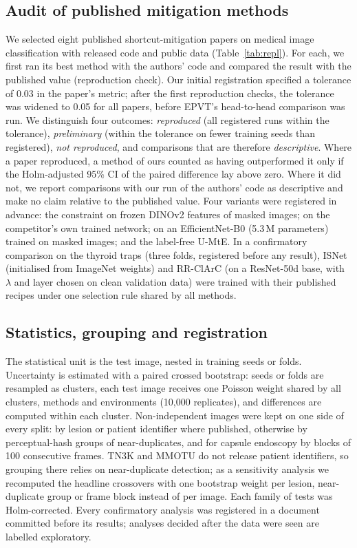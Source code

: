 \documentclass[12pt]{article}
\begin{document}
\subsection*{Audit of published mitigation methods}
We selected eight published shortcut-mitigation papers on medical image classification with released code and public data
(Table~\ref{tab:repl}). For each, we first ran its best method with the authors' code and compared the result with the
published value (reproduction check). Our initial registration specified a tolerance of 0.03 in the paper's metric; after
the first reproduction checks, the tolerance was widened to 0.05 for all papers, before EPVT's head-to-head comparison was
run. We distinguish four outcomes: \emph{reproduced} (all registered runs within the tolerance), \emph{preliminary}
(within the tolerance on fewer training seeds than registered), \emph{not reproduced}, and comparisons that are
therefore \emph{descriptive}. Where a paper reproduced, a method of ours counted as having outperformed it only if the
Holm-adjusted 95\% CI of the paired difference lay above zero. Where it did not, we report comparisons with our run of
the authors' code as descriptive and make no claim relative to the published value. Four variants were registered in
advance: the constraint on frozen DINOv2 features of masked images; on the competitor's own trained network; on an
EfficientNet-B0 (5.3\,M parameters) trained on masked images; and the label-free U-MtE. In a confirmatory comparison on
the thyroid traps (three folds, registered before any result), ISNet \cite{bassi2024isnet} (initialised from ImageNet
weights) and RR-ClArC \cite{pahde2025ensuring} (on a ResNet-50d base, with $\lambda$ and layer chosen on clean validation
data) were trained with their published recipes under one selection rule shared by all methods.

\subsection*{Statistics, grouping and registration}
The statistical unit is the test image, nested in training seeds or folds. Uncertainty is estimated with a paired
crossed bootstrap: seeds or folds are resampled as clusters, each test image receives one Poisson weight shared by all
clusters, methods and environments (10,000 replicates), and differences are computed within each cluster. Non-independent
images were kept on one side of every split: by lesion or patient identifier where published, otherwise by
perceptual-hash groups of near-duplicates, and for capsule endoscopy by blocks of 100 consecutive frames. TN3K and MMOTU
do not release patient identifiers, so grouping there relies on near-duplicate detection; as a sensitivity analysis we
recomputed the headline crossovers with one bootstrap weight per lesion, near-duplicate group or frame block instead of
per image. Each family of tests was Holm-corrected. Every confirmatory analysis was registered in a document committed
before its results; analyses decided after the data were seen are labelled exploratory.
\end{document}
